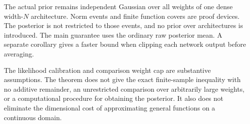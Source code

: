 \documentclass[11pt]{article}
\theoremstyle{definition}\newtheorem{definition}[theorem]{Definition}
\theoremstyle{remark}\newtheorem{remark}[theorem]{Remark}
\begin{document}
The actual prior remains independent Gaussian over all weights of one
dense width-$N$ architecture. Norm events and finite function covers are
proof devices. The posterior is not restricted to those events, and no
prior over architectures is introduced. The main guarantee uses the ordinary raw posterior mean. A separate
corollary gives a faster bound when clipping each network output before
averaging.

The likelihood calibration and comparison weight cap are substantive
assumptions. The theorem does not give the exact finite-sample inequality
with no additive remainder, an unrestricted comparison over arbitrarily
large weights, or a computational procedure for obtaining the posterior.
It also does not eliminate the dimensional cost of approximating general
functions on a continuous domain.
\end{document}
